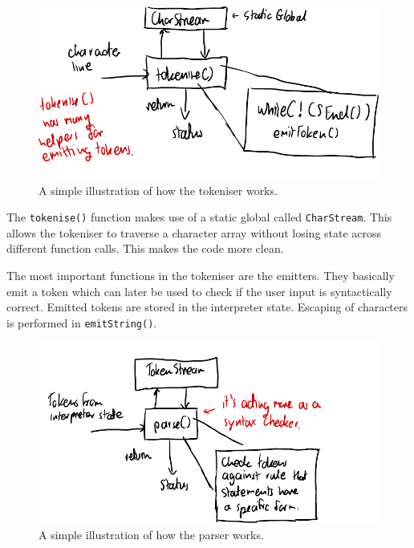 \documentclass[12pt]{article}
\begin{document}
\begin{figure}[H]
\centering
\includegraphics{tokeniser}
\caption{A simple illustration of how the tokeniser works.}
\end{figure}



The \texttt{tokenise()} function makes use of a static global
called \texttt{CharStream}. This allows the tokeniser to
traverse a character array without losing state across different
function calls. This makes the code more clean.

\newpage



The most important functions in the tokeniser are the emitters.
They basically emit a token which can later be used to check if
the user input is syntactically correct. Emitted tokens are
stored in the interpreter state. Escaping of characters is
performed in \texttt{emitString()}.

\begin{figure}[H]
\centering
\includegraphics{parser}
\caption{A simple illustration of how the parser works.}
\end{figure}
\end{document}

